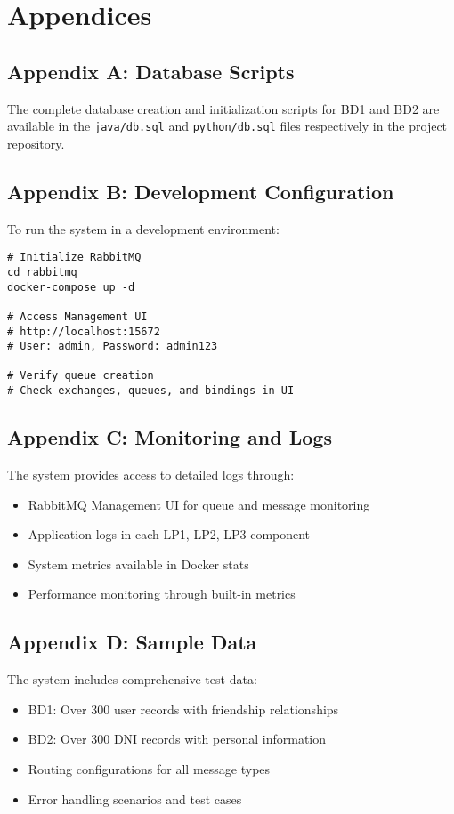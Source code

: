 \documentclass[10pt,a4paper]{article}
\theoremstyle{definition}
\theoremstyle{remark}
\begin{document}
\section{Appendices}

\subsection{Appendix A: Database Scripts}
The complete database creation and initialization scripts for BD1 and BD2 are available in the \texttt{java/db.sql} and \texttt{python/db.sql} files respectively in the project repository.

\subsection{Appendix B: Development Configuration}
To run the system in a development environment:

\begin{lstlisting}[style=sqlstyle, caption={Deployment Commands}]
# Initialize RabbitMQ
cd rabbitmq
docker-compose up -d

# Access Management UI
# http://localhost:15672
# User: admin, Password: admin123

# Verify queue creation
# Check exchanges, queues, and bindings in UI
\end{lstlisting}

\subsection{Appendix C: Monitoring and Logs}
The system provides access to detailed logs through:
\begin{itemize}
    \item RabbitMQ Management UI for queue and message monitoring
    \item Application logs in each LP1, LP2, LP3 component
    \item System metrics available in Docker stats
    \item Performance monitoring through built-in metrics
\end{itemize}

\subsection{Appendix D: Sample Data}
The system includes comprehensive test data:
\begin{itemize}
    \item BD1: Over 300 user records with friendship relationships
    \item BD2: Over 300 DNI records with personal information
    \item Routing configurations for all message types
    \item Error handling scenarios and test cases
\end{itemize}
\end{document}
